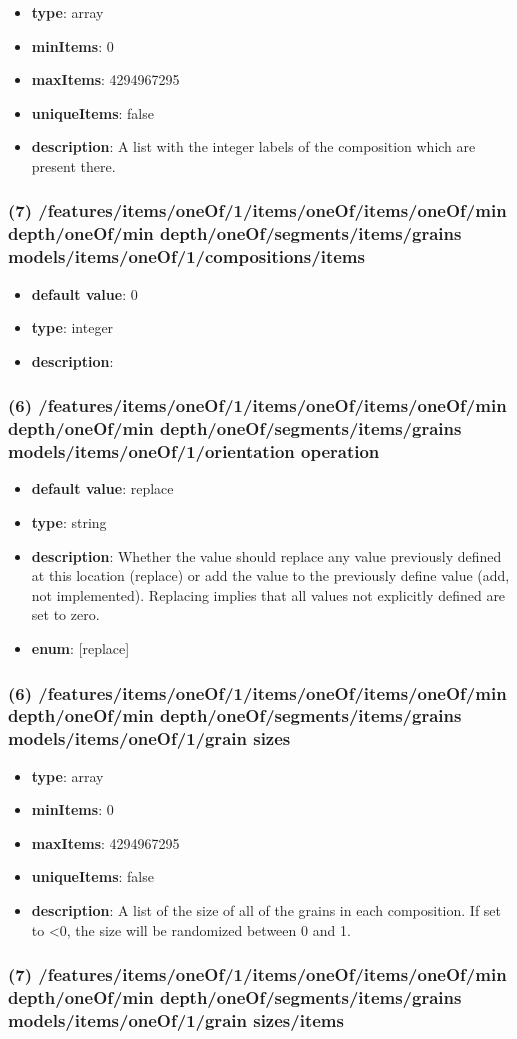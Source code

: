 \begin{itemize}[leftmargin=6em]\item {\bf type}: array
\item {\bf minItems}: 0
\item {\bf maxItems}: 4294967295
\item {\bf uniqueItems}: false
\item {\bf description}: A list with the integer labels of the composition which are present there.
\end{itemize}\subsubsection{(7) /features/items/oneOf/1/items/oneOf/items/oneOf/min depth/oneOf/min depth/oneOf/segments/items/grains models/items/oneOf/1/compositions/items}
\begin{itemize}[leftmargin=7em]\item {\bf default value}: 0
\item {\bf type}: integer
\item {\bf description}: 
\end{itemize}\subsubsection{(6) /features/items/oneOf/1/items/oneOf/items/oneOf/min depth/oneOf/min depth/oneOf/segments/items/grains models/items/oneOf/1/orientation operation}
\begin{itemize}[leftmargin=6em]\item {\bf default value}: replace
\item {\bf type}: string
\item {\bf description}: Whether the value should replace any value previously defined at this location (replace) or add the value to the previously define value (add, not implemented). Replacing implies that all values not explicitly defined are set to zero.
\item {\bf enum}: [replace]\end{itemize}\subsubsection{(6) /features/items/oneOf/1/items/oneOf/items/oneOf/min depth/oneOf/min depth/oneOf/segments/items/grains models/items/oneOf/1/grain sizes}
\begin{itemize}[leftmargin=6em]\item {\bf type}: array
\item {\bf minItems}: 0
\item {\bf maxItems}: 4294967295
\item {\bf uniqueItems}: false
\item {\bf description}: A list of the size of all of the grains in each composition. If set to <0, the size will be randomized between 0 and 1.
\end{itemize}\subsubsection{(7) /features/items/oneOf/1/items/oneOf/items/oneOf/min depth/oneOf/min depth/oneOf/segments/items/grains models/items/oneOf/1/grain sizes/items}
